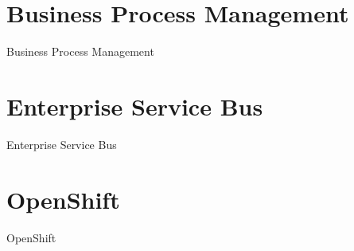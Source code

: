 
\section{Business Process Management}
\label{sec:bpm}

Business Process Management


\section{Enterprise Service Bus}
\label{sec:esb}

Enterprise Service Bus


\section{OpenShift}
\label{sec:openShift}

OpenShift

